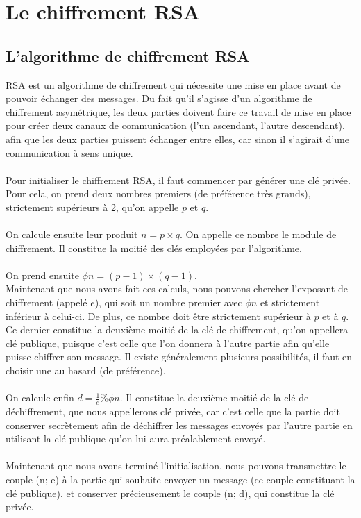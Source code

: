 \chapter{Le chiffrement RSA}
	\section{L'algorithme de chiffrement RSA}
		RSA est un algorithme de chiffrement qui nécessite une mise en place avant de pouvoir échanger des messages. Du fait qu'il s'agisse d'un algorithme de chiffrement asymétrique, les deux parties doivent faire ce travail de mise en place pour créer deux canaux de communication (l'un ascendant, l'autre descendant), afin que les deux parties puissent échanger entre elles, car sinon il s'agirait d'une communication à sens unique.\\
		\\
		Pour initialiser le chiffrement RSA, il faut commencer par générer une clé privée. Pour cela, on prend deux nombres premiers (de préférence très grands), strictement supérieurs à 2, qu'on appelle $p$ et $q$.\\
		\\
		On calcule ensuite leur produit $n = p \times q$. On appelle ce nombre le module de chiffrement. Il constitue la moitié des clés employées par l'algorithme.\\
		\\
		On prend ensuite $\phi{n} = (p - 1) \times (q - 1)$.\\
		Maintenant que nous avons fait ces calculs, nous pouvons chercher l'exposant de chiffrement (appelé $e$), qui soit un nombre premier avec $\phi{n}$ et strictement inférieur à celui-ci. De plus, ce nombre doit être strictement supérieur à $p$ et à $q$. Ce dernier constitue la deuxième moitié de la clé de chiffrement, qu'on appellera clé publique, puisque c'est celle que l'on donnera à l'autre partie afin qu'elle puisse chiffrer son message. Il existe généralement plusieurs possibilités, il faut en choisir une au hasard (de préférence).\\
		\\
		On calcule enfin $d = \frac{1}{e} \% \phi{n}$. Il constitue la deuxième moitié de la clé de déchiffrement, que nous appellerons clé privée, car c'est celle que la partie doit conserver secrètement afin de déchiffrer les messages envoyés par l'autre partie en utilisant la clé publique qu'on lui aura préalablement envoyé.\\
		\\
		Maintenant que nous avons terminé l'initialisation, nous pouvons transmettre le couple (n; e) à la partie qui souhaite envoyer un message (ce couple constituant la clé publique), et conserver précieusement le couple (n; d), qui constitue la clé privée.\\
